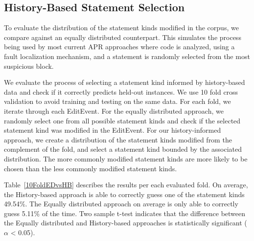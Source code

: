 \documentclass[sigconf]{acmart}
\begin{document}
\subsection{History-Based Statement Selection}

To evaluate the distribution of the statement kinds modified
in the corpus, we compare against an equally distributed counterpart.
This simulates the process being used by most current APR approaches
where code is analyzed, using a fault localization 
mechanism, and a statement is randomly selected from the most
suspicious block.

We evaluate the process of selecting a statement kind informed by 
history-based data and check if it correctly predicts held-out 
instances.
We use 10 fold
cross validation to avoid training and testing on the same data.
For each fold, we
iterate through each EditEvent. For
the equally distributed approach, we randomly select one from 
all possible statement kinds and check if the selected
statement kind was modified in the EditEvent.
For our history-informed approach, we create a distribution
of the statement kinds modified from the complement of the fold, 
and select a statement
kind bounded by the associated distribution.
The more commonly modified statement
kinds are more likely to be chosen than the less commonly modified
statement kinds.

Table~\ref{10FoldEDvsHB} describes the results per each evaluated fold.
On average, 
the History-based approach is able to correctly guess one of the statement kinds
49.54\%. The Equally distributed approach
on average is only able to correctly guess 5.11\% of the time.
Two sample t-test indicates that the difference between the Equally distributed
and History-based approaches is statistically significant ($\alpha$ < 0.05).
\end{document}
